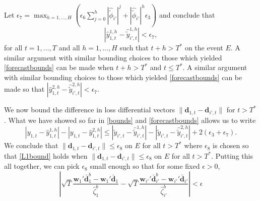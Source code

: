 \documentclass[11pt]{article}
\newcommand{\R}{\mathbb{R}}
\newcommand{\dbf}{\textbf{d}}
\theoremstyle{definition}
\begin{document}
Let $\epsilon_7 = \max_{h = 1,\ldots,H}\left(\epsilon_6 \sum_{j=0}^h |\hat{\tilde{\phi}}_{i'}|^j + |\hat{\tilde{\phi}}_{i'}|^h\epsilon_3\right)$ 
and conclude that 
\begin{equation} \label{forecastbounds}
  |\hat{y}_{1,t}^{1,h} - \hat{\tilde{y}}_{i',t}^{1,h}| < \epsilon_7,	
\end{equation}
for all $t = 1,\ldots,T$ and all $h=1,\ldots,H$ such that $t+h > T^*$ on the event $E$. A similar argument with similar bounding choices to those which yielded \eqref{forecastbounds} can be made when $t+h > T^*$ and $t \leq T^*$. A similar argument with similar bounding choices to those which yielded \eqref{forecastbounds} can be made so that $|\hat{y}_{1,t}^{2,h} - \hat{\tilde{y}}_{i',t}^{2,h}| < \epsilon_7$.

We now bound the difference in loss differential vectors $\|\dbf_{1,t} - \dbf_{i',t}\|$ for $t > T^*$. What we have showed so far in \eqref{bounds} and \eqref{forecastbounds} allows us to write
\begin{equation} \label{L1bound}
  |y_{1,t} - \hat{y}^{1,h}_{1,t}| - |y_{1,t} - \hat{y}^{2,h}_{1,t}| \leq |\tilde{y}_{i',t} - \hat{\tilde{y}}^{1,h}_{i',t}| - |\tilde{y}_{i',t} - \hat{\tilde{y}}^{2,h}_{i',t}| + 2(\epsilon_3 + \epsilon_7).
\end{equation}
We conclude that $\|\dbf_{1,t} - \dbf_{i',t}\| \leq \epsilon_8$ on $E$ for all $t > T^*$ where $\epsilon_8$ is chosen so that \eqref{L1bound} holds when $\|\dbf_{1,t} - \dbf_{i',t}\| \leq \epsilon_8$ on $E$ for all $t > T^*$.
Putting this all together, we can pick $\epsilon_8$ small enough so that for some fixed $\epsilon > 0$,
\begin{equation} \label{testbounds}
   \left|\sqrt{T}\frac{\textbf{w}_1'\bar{\dbf}_1^b - \textbf{w}_1'\bar{\dbf}_1}{\hat{\zeta}^b_1} - \sqrt{T}\frac{\textbf{w}_{i'}'\bar{\dbf}_{i'}^b - \textbf{w}_{i'}'\bar{\dbf}_{i'}}{\hat{\zeta}^b_{i'}}\right| < \epsilon	
\end{equation}
\end{document}

